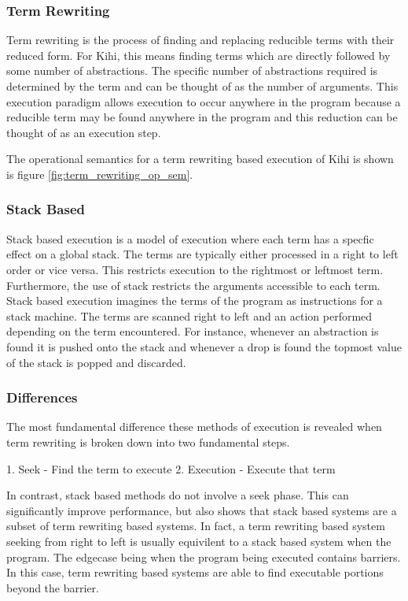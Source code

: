 \subsubsection{Term Rewriting}
Term rewriting is the process of finding
and replacing reducible terms with their reduced form. For Kihi,
this means finding terms which are directly followed by
some number of abstractions. The specific number of abstractions
required is determined by the term and can be thought of as the
number of arguments. This execution paradigm allows execution
to occur anywhere in the program because a reducible term may
be found anywhere in the program and this reduction can be
thought of as an execution step.

The operational semantics for a term rewriting based execution of
Kihi is shown is figure \ref{fig:term_rewriting_op_sem}.





\subsubsection{Stack Based}
Stack based execution is a model of execution where each term
has a specfic effect on a global stack. The terms are typically
either processed in a right to left order or vice versa. This
restricts execution to the rightmost or leftmost term. Furthermore,
the use of stack restricts the arguments accessible to each term.
Stack based execution imagines the terms of the program as
instructions for a stack machine. The terms are scanned
right to left and an action performed depending on the term
encountered. For instance, whenever an abstraction is found
it is pushed onto the stack and whenever a drop is found the
topmost value of the stack is popped and discarded.

\subsubsection{Differences}
The most fundamental difference these methods of execution is
revealed when term rewriting is broken down into two fundamental steps.

1. Seek
    - Find the term to execute
2. Execution
    - Execute that term

In contrast, stack based methods do not involve a seek phase. This
can significantly improve performance, but also shows that stack
based systems are a subset of term rewriting based systems. In fact,
a term rewriting based system seeking from right to left is usually 
equivilent to a stack based system when the program. The edgecase
being when the program being executed contains barriers. In this case,
term rewriting based systems are able to find executable portions
beyond the barrier.

